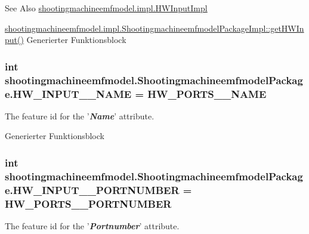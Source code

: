 \begin{DoxySeeAlso}{See Also}
\hyperlink{classshootingmachineemfmodel_1_1impl_1_1_h_w_input_impl}{shootingmachineemfmodel.\-impl.\-H\-W\-Input\-Impl} 

\hyperlink{classshootingmachineemfmodel_1_1impl_1_1_shootingmachineemfmodel_package_impl_a2b76b45b62288e086096d893264e4232}{shootingmachineemfmodel.\-impl.\-Shootingmachineemfmodel\-Package\-Impl\-::get\-H\-W\-Input()} Generierter Funktionsblock 
\end{DoxySeeAlso}
\hypertarget{interfaceshootingmachineemfmodel_1_1_shootingmachineemfmodel_package_aca3df42c3daea63181ee2a2aa5ed1fac}{
\subsubsection[{H\-W\-\_\-\-I\-N\-P\-U\-T\-\_\-\-\_\-\-N\-A\-M\-E}]{\setlength{\rightskip}{0pt plus 5cm}int shootingmachineemfmodel.\-Shootingmachineemfmodel\-Package.\-H\-W\-\_\-\-I\-N\-P\-U\-T\-\_\-\-\_\-\-N\-A\-M\-E = {\bf H\-W\-\_\-\-P\-O\-R\-T\-S\-\_\-\-\_\-\-N\-A\-M\-E}}}\label{interfaceshootingmachineemfmodel_1_1_shootingmachineemfmodel_package_aca3df42c3daea63181ee2a2aa5ed1fac}
The feature id for the '{\itshape {\bfseries Name}}' attribute.

Generierter Funktionsblock  \hypertarget{interfaceshootingmachineemfmodel_1_1_shootingmachineemfmodel_package_ac54ab200e6b01aa749998ba59d67d36b}{
\subsubsection[{H\-W\-\_\-\-I\-N\-P\-U\-T\-\_\-\-\_\-\-P\-O\-R\-T\-N\-U\-M\-B\-E\-R}]{\setlength{\rightskip}{0pt plus 5cm}int shootingmachineemfmodel.\-Shootingmachineemfmodel\-Package.\-H\-W\-\_\-\-I\-N\-P\-U\-T\-\_\-\-\_\-\-P\-O\-R\-T\-N\-U\-M\-B\-E\-R = {\bf H\-W\-\_\-\-P\-O\-R\-T\-S\-\_\-\-\_\-\-P\-O\-R\-T\-N\-U\-M\-B\-E\-R}}}\label{interfaceshootingmachineemfmodel_1_1_shootingmachineemfmodel_package_ac54ab200e6b01aa749998ba59d67d36b}
The feature id for the '{\itshape {\bfseries Portnumber}}' attribute.

